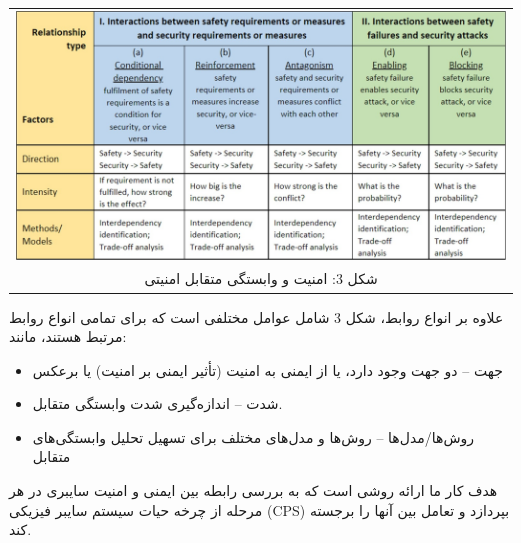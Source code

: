 \documentclass[a4paper,10pt]{article}
\begin{document}
        \begin{table}
            
            \centering
            \begin{tabular}{ c }
                
                \includegraphics[width=1\textwidth]{Image/fig3.jpg} \\

                شکل 3: امنیت و وابستگی متقابل امنیتی

            \end{tabular}

        \end{table}

        علاوه بر انواع روابط، شکل 3 شامل عوامل مختلفی است که برای تمامی انواع روابط مرتبط هستند، مانند:
        
        \begin{itemize}
            
            \item جهت – دو جهت وجود دارد، یا از ایمنی به امنیت (تأثیر ایمنی بر امنیت) یا برعکس
            
            \item شدت – اندازه‌گیری شدت وابستگی متقابل.

            \item روش‌ها/مدل‌ها – روش‌ها و مدل‌های مختلف برای تسهیل تحلیل وابستگی‌های متقابل

        \end{itemize}

        هدف کار ما ارائه روشی است که به بررسی رابطه بین ایمنی و امنیت سایبری در هر مرحله از چرخه حیات سیستم سایبر فیزیکی (CPS) بپردازد و تعامل بین آنها را برجسته کند.
\end{document}
